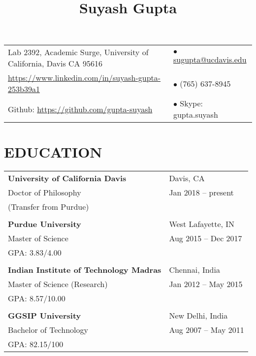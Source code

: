 \documentclass[10pt]{article}
\title{\vspace*{-2cm} \raggedright {\bf Suyash Gupta}}
\date{\vspace{-10ex}}	%
\begin{document}



\maketitle
{\hspace{-0.9cm}
\begin{tabular}{ll}
Lab 2392, Academic Surge, University of California, Davis CA 95616 	& $\bullet$ \href{mailto:sugupta@ucdavis.edu}{sugupta@ucdavis.edu} \\ 
\url{https://www.linkedin.com/in/suyash-gupta-253b39a1} & $\bullet$ (765) 637-8945 \\
Github: \url{https://github.com/gupta-suyash}  		& $\bullet$ Skype: gupta.suyash \\
\end{tabular}\newline
}

\section*{EDUCATION}
{\setlength{\tabcolsep}{40pt}
\hspace{-1.5cm}
\begin{tabular}{ll}
{\bf University of California Davis} 		& Davis, CA 		\\
Doctor of Philosophy				& Jan 2018 -- present 	\\
(Transfer from Purdue)				&			\\
						&			\\
{\bf Purdue University} 			& West Lafayette, IN 	\\
Master of Science				& Aug 2015 -- Dec 2017 	\\
GPA: 3.83/4.00					&			\\
						&			\\
{\bf Indian Institute of Technology Madras}	& Chennai, India	\\
Master of Science (Research)			& Jan 2012 -- May 2015 	\\
GPA: 8.57/10.00					&			\\
						&			\\
{\bf GGSIP University}				& New Delhi, India	\\ 
Bachelor of Technology				& Aug 2007 -- May 2011	\\
GPA: 82.15/100					&			\\
\end{tabular}}
\end{document}
